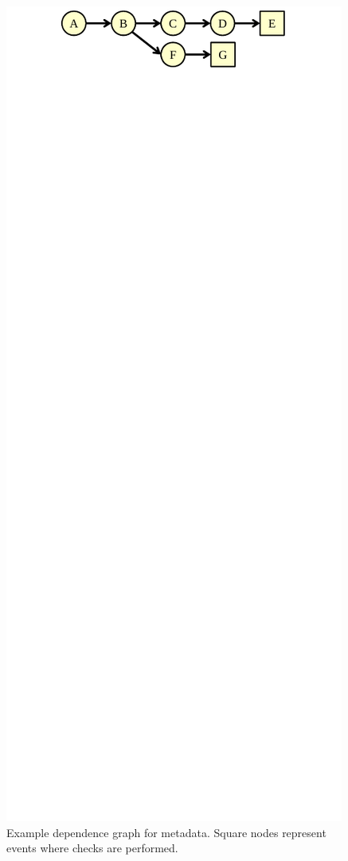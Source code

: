 \begin{figure}
  \begin{center}
    \includegraphics[width=\columnwidth]{figs/dataflow_graph.pdf}
    \vspace{-0.3in}
    \caption{Example dependence graph for metadata. Square nodes represent
    events where checks are performed.} 
    \label{fig:drop.dataflow_graph}
    \vspace{-0.1in}
  \end{center}
\end{figure}

